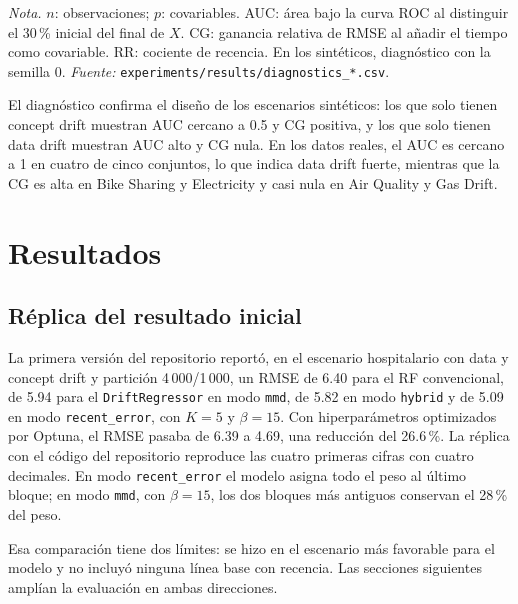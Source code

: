 \documentclass[11pt,a4paper]{article}
\newcommand{\nota}[1]{\par\smallskip\raggedright\footnotesize\textit{Nota.} #1}
\begin{document}
\begin{table}[htbp]
  \centering
  \caption{Conjuntos de datos y diagnóstico de drift}\label{tab:datasets}
  \small
  
  \nota{$n$: observaciones; $p$: covariables. AUC: área bajo la curva ROC al distinguir el 30\,\%
  inicial del final de $X$. CG: ganancia relativa de RMSE al añadir el tiempo como covariable. RR:
  cociente de recencia. En los sintéticos, diagnóstico con la semilla 0. \textit{Fuente:}
  \texttt{experiments/results/diagnostics\_*.csv}.}
\end{table}

El diagnóstico confirma el diseño de los escenarios sintéticos: los que solo tienen concept drift
muestran AUC cercano a 0.5 y CG positiva, y los que solo tienen data drift muestran AUC alto y CG
nula. En los datos reales, el AUC es cercano a 1 en cuatro de cinco conjuntos, lo que indica data
drift fuerte, mientras que la CG es alta en Bike Sharing y Electricity y casi nula en Air Quality y
Gas Drift.

\section{Resultados}\label{sec:resultados}

\subsection{Réplica del resultado inicial}\label{sec:res-replica}

La primera versión del repositorio reportó, en el escenario hospitalario con data y concept drift y
partición 4\,000/1\,000, un RMSE de 6.40 para el RF convencional, de 5.94 para el
\texttt{DriftRegressor} en modo \texttt{mmd}, de 5.82 en modo \texttt{hybrid} y de 5.09 en modo
\texttt{recent\_error}, con $K=5$ y $\beta=15$. Con hiperparámetros optimizados por Optuna, el RMSE
pasaba de 6.39 a 4.69, una reducción del 26.6\,\%. La réplica con el código del repositorio reproduce
las cuatro primeras cifras con cuatro decimales. En modo \texttt{recent\_error} el modelo asigna
todo el peso al último bloque; en modo \texttt{mmd}, con $\beta=15$, los dos bloques más antiguos
conservan el 28\,\% del peso.

Esa comparación tiene dos límites: se hizo en el escenario más favorable para el modelo y no incluyó
ninguna línea base con recencia. Las secciones siguientes amplían la evaluación en ambas direcciones.
\end{document}
